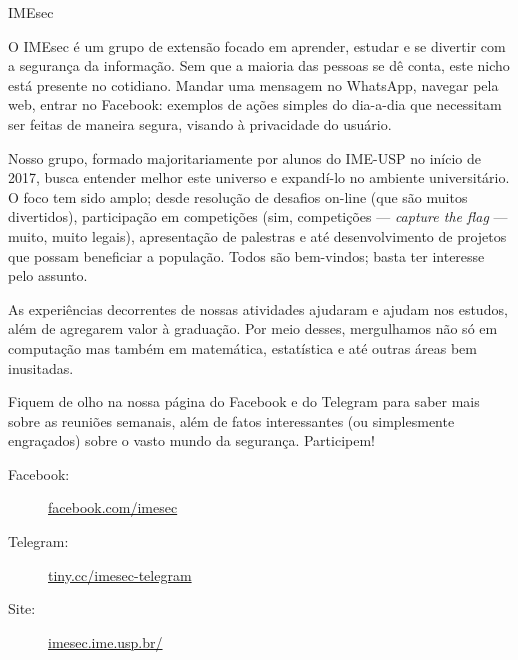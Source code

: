 \begin{subsecao}{IMEsec}


O IMEsec é um grupo de extensão focado em aprender, estudar e se divertir com a
segurança da informação. Sem que a maioria das pessoas se dê conta, este nicho
está presente no cotidiano. Mandar uma mensagem no WhatsApp, navegar pela web,
entrar no Facebook: exemplos de ações simples do dia-a-dia que necessitam ser
feitas de maneira segura, visando à privacidade do usuário.

Nosso grupo, formado majoritariamente por alunos do IME-USP no início de 2017,
busca entender melhor este universo e expandí-lo no ambiente universitário. O
foco tem sido amplo; desde resolução de desafios on-line (que são muitos
divertidos), participação em competições (sim, competições — \textit{capture the
flag} — muito, muito legais), apresentação de palestras e até desenvolvimento de
projetos que possam beneficiar a população. Todos são bem-vindos; basta ter
interesse pelo assunto.

As experiências decorrentes de nossas atividades ajudaram e ajudam nos estudos,
além de agregarem valor à graduação. Por meio desses, mergulhamos não só em
computação mas também em matemática, estatística e até outras áreas bem
inusitadas.

Fiquem de olho na nossa página do Facebook e do Telegram para saber mais sobre
as reuniões semanais, além de fatos interessantes (ou simplesmente engraçados)
sobre o vasto mundo da segurança. Participem!

\begin{description}
  \item[Facebook:] \url{facebook.com/imesec}
  \item[Telegram:] \url{tiny.cc/imesec-telegram}
  \item[Site:] \url{imesec.ime.usp.br/}
\end{description}

\end{subsecao}
